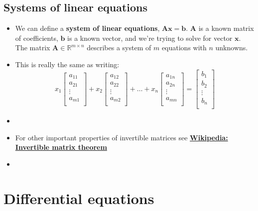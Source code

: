 \documentclass{article}
\begin{document}
\begin{multicols*}{2}
\subsection{Systems of linear equations}
\begin{itemize}
    \item We can define a \textbf{system of linear equations}, $\bm{Ax}=\bm{b}$. $\bm{A}$ is a known matrix of coefficients, $\bm{b}$ is a known vector, and we're trying to solve for vector $\bm{x}$. The matrix $\bm{A} \in \mathbb{R}^{m \times n}$ describes a system of $m$ equations with $n$ unknowns.
    \item This is really the same as writing:
    $$ x_1 \begin{bmatrix}
     a_{11}\\
     a_{21}\\
     \vdots \\
     a_{m1}\\ \end{bmatrix} +
     x_2 \begin{bmatrix}
     a_{12}\\
     a_{22}\\
     \vdots \\
     a_{m2}\\ \end{bmatrix} +
     \hdots +
     x_n \begin{bmatrix}
     a_{1n}\\
     a_{2n}\\
     \vdots \\
     a_{mn}\\ \end{bmatrix} =
     \begin{bmatrix}
     b_{1}\\
     b_{2}\\
     \vdots \\
     b_{n}\\ \end{bmatrix}
     $$

    \item
    \item For other important properties of invertible matrices see \href{https://en.wikipedia.org/wiki/Invertible_matrix#The_invertible_matrix_theorem}
    {\textbf{Wikipedia: Invertible matrix theorem}}
    \item
    \end{itemize}

\section{Differential equations}

\end{multicols*}
\end{document}
